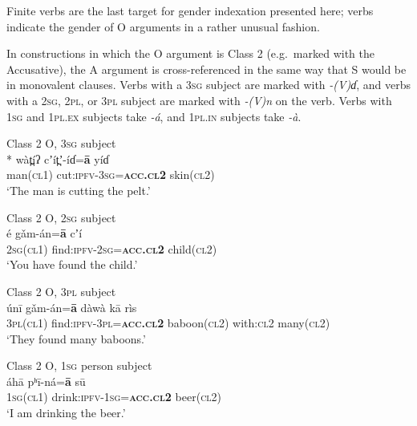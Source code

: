 \documentclass[output=collectionpaper,hidelinks]{langscibook}
\theoremstyle{remark}
\begin{document}
Finite verbs are the last target for gender indexation presented here; verbs
indicate the gender of O arguments in a rather unusual fashion.

In constructions in which the O argument is Class 2 (e.g.\ marked with the
Accusative), the A argument is cross-referenced in the same way that S would be
in monovalent clauses. Verbs with a \textsc{3sg} subject are marked with \emph{-(V)ɗ},
and verbs with a \textsc{2sg}, \textsc{2pl}, or \textsc{3pl} subject are marked with \emph{-(V)n} on the
verb. Verbs with \textsc{1sg} and \textsc{1pl.ex} subjects take \textit{-á}, and \textsc{1pl.in} subjects take \textit{-à}.

\ea
\label{ex:Don:cut-pelt}
Class 2 O, \textsc{3sg} subject \\*
\gll wàt̪íʔ cʼít̪ʼ-íɗ=\textbf{ā} yíɗ \\
 man(\textsc{cl1}) cut:\textsc{ipfv}-\textsc{3sg}=\textbf{\textsc{acc.cl2}} skin(\textsc{cl2}) \\
\glt `The man is cutting the pelt.' \\
\z

\ea
\label{ex:Don:find-child}
Class 2 O, \textsc{2sg} subject \\
\gll é gǎm-án=\textbf{ā} cʼí \\
 \textsc{2sg}(\textsc{cl1}) find:\textsc{ipfv}-\textsc{2sg}=\textbf{\textsc{acc.cl2}} child(\textsc{cl2}) \\
\glt `You have found the child.' \\
\z

\ea
\label{ex:Don:find-baboons}
Class 2 O, \textsc{3pl} subject \\
\gll únī gǎm-án=\textbf{ā} dàwà kā rìs \\
 \textsc{3pl}(\textsc{cl1}) find:\textsc{ipfv}-\textsc{3pl}=\textbf{\textsc{acc.cl2}} baboon(\textsc{cl2}) with:\textsc{cl2} many(\textsc{cl2}) \\
\glt `They found many baboons.' \\
\z

\ea\label{ex:Don:drink-beer}
 Class 2 O, \textsc{1sg} person subject \\
\gll áhā pʰī-ná=\textbf{ā} sū \\
 \textsc{1sg}(\textsc{cl1}) drink:\textsc{ipfv}-\textsc{1sg}=\textbf{\textsc{acc.cl2}} beer(\textsc{cl2}) \\
\glt `I am drinking the beer.' \\
\z
\end{document}
